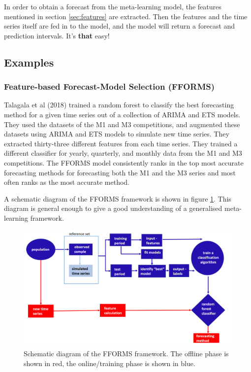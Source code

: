 \documentclass[a4paper,12pt]{article}
\theoremstyle{definition}
\begin{document}
In order to obtain a forecast from the meta-learning model, the features mentioned in section \ref{sec:features} are extracted. Then the features and the time series itself are fed in to the model, and the model will return a forecast and prediction intervals. It's \textbf{that} easy!

\subsection{Examples}
\subsubsection{Feature-based Forecast-Model Selection (FFORMS)\cite{talagala}}
Talagala et al (2018) trained a random forest to classify the best forecasting method for a given time series out of a collection of ARIMA and ETS models. They used the datasets of the M1 and M3 competitions, and augmented these datasets using ARIMA and ETS models to simulate new time series. They extracted thirty-three different features from each time series. They trained a different classifier for yearly, quarterly, and monthly data from the M1 and M3 competitions. The FFORMS model consistently ranks in the top most accurate forecasting methods
for forecasting both the M1 and the M3 series and most often ranks as the most accurate method.

A schematic diagram of the FFORMS framework is shown in figure \ref{fig:FFORMS}. This diagram is general enough to give a good understanding of a generalised meta-learning framework.

\begin{figure}[ht]
	\centering
	\includegraphics[width=\textwidth]{figures/FFORMS.png}
	\caption{Schematic diagram of the FFORMS framework. The offline phase is shown in red, the online/training phase is shown in blue.}
	\label{fig:FFORMS}
\end{figure}
\end{document}
